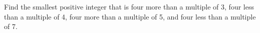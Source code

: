 Find the smallest positive integer that is four more than a multiple of 3, four less than a multiple of 4, four more than a multiple of 5, and four less than a multiple of 7.
